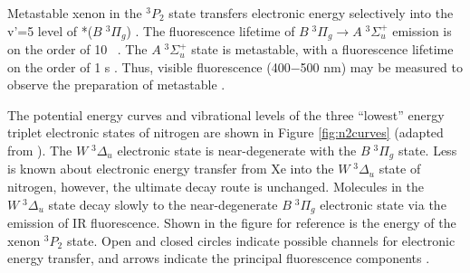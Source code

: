 Metastable xenon in the $^3P_2$ state transfers electronic energy
selectively into the v'=5 level of *($B \; ^3\Pi_g$)
\cite{krumpelmann87, krumpelmann88, ottinger95b, aardema94}.  The
fluorescence lifetime of $B \; ^3\Pi_g \rightarrow A \; ^3\Sigma_u^+$
emission is on the order of 10 \microsec\ \cite{lofthus77}.  The $A \;
^3\Sigma_u^+$ state is metastable, with a fluorescence lifetime on the
order of 1 s \cite{lofthus77}.  Thus, visible fluorescence (400$-$500
nm) may be measured to observe the preparation of metastable .

The potential energy curves and vibrational levels of the three
``lowest'' energy triplet electronic states of nitrogen are shown in
Figure \ref{fig:n2curves} (adapted from \cite{krumpelmann87}).  The $W
\; ^3\Delta_u$ electronic state is near-degenerate with the $B \;
^3\Pi_g$ state.  Less is known about electronic energy transfer from
Xe into the $W \; ^3\Delta_u$ state of nitrogen, however, the ultimate
decay route is unchanged.  Molecules in the $W \; ^3\Delta_u$ state
decay slowly to the near-degenerate $B \; ^3\Pi_g$ electronic state
via the emission of IR fluorescence.  Shown in the figure for
reference is the energy of the xenon $^3P_2$ state.  Open and closed
circles indicate possible channels for electronic energy transfer, and
arrows indicate the principal fluorescence components
\cite{krumpelmann87}.

